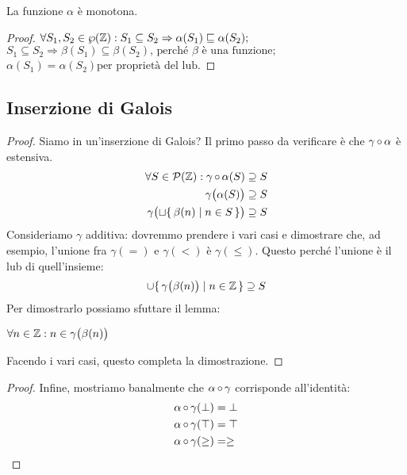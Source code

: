 \begin{proposizione}
La funzione $\alpha$ è monotona.
\end{proposizione}
\begin{proof}
	$ \forall S_1, S_2 \in \wp(\mathbb{Z}) : S_1 \subseteq S_2 \Rightarrow \alpha(S_1) \sqsubseteq \alpha(S_2)\text{;} $ \\
	$ S_1 \subseteq S_2 \Rightarrow \beta(S_1) \subseteq \beta(S_2) \text{, perché } \beta \text{ è  una funzione;} $ \\
	$ \alpha(S_1) = \alpha(S_2) \text{per proprietà del lub.} $
\end{proof}

\subsection{Inserzione di Galois}

\begin{proof}
Siamo in un'inserzione di Galois? Il primo passo da verificare è che $\mathrm{\gamma}\mathop{\circ}\mathrm{\alpha}$ è estensiva. 
\begin{align*}
	\forall S \in \mathcal{P}(\mathbb{Z}) : \mathrm{\gamma}\mathop{\circ}\mathrm{\alpha}(S) &\supseteq S \\
	\gamma\bigl(\alpha(S)\bigr) &\supseteq S \\
	\gamma\bigl(\sqcup \{\, \beta(n) \mid n \in S \,\} \bigr) &\supseteq S
\end{align*}
Consideriamo $\gamma$ additiva: dovremmo prendere i vari casi e
dimostrare che, ad esempio, l'unione fra
$\gamma(=)$ e $\gamma(<)$ è $\gamma(\leq)$.
Questo perché l'unione è il lub di quell'insieme:
\[
	\cup \{\, \gamma\bigl(\beta(n)\bigr) \mid n \in \mathbb{Z} \,\} \supseteq S
\]
Per dimostrarlo possiamo sfuttare il lemma:
\begin{lemma}
	$ \forall n \in \mathbb{Z} : n \in \gamma\bigl(\beta(n)\bigr) $
\end{lemma}
Facendo i vari casi, questo completa la dimostrazione.
\end{proof}

\begin{proof}
Infine, mostriamo banalmente che $\mathrm{\alpha}\mathop{\circ}\mathrm{\gamma}$ corrisponde all'identità:
\begin{align*}
	\mathrm{\alpha}\mathop{\circ}\mathrm{\gamma}(\bot) &= \bot \\
	\mathrm{\alpha}\mathop{\circ}\mathrm{\gamma}(\top) &= \top \\
	\mathrm{\alpha}\mathop{\circ}\mathrm{\gamma}(\geq) &= \geq
\end{align*}
\end{proof}

